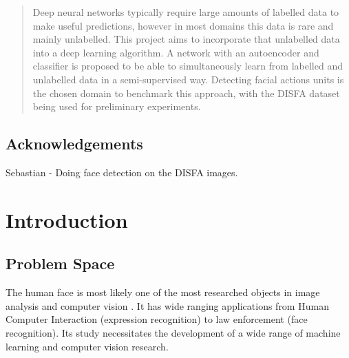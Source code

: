 \documentclass[11pt,twoside]{report}
\date{September 2016}
\begin{document}



\clearpage{\pagestyle{empty}\cleardoublepage}
\setcounter{page}{1}
\pagestyle{fancy}

\begin{abstract}
  Deep neural networks typically require large amounts of labelled data to make useful
  predictions, however in most domains this data is rare and mainly unlabelled.
  This project aims to incorporate that unlabelled data into a deep learning algorithm.
  A network with an autoencoder and classifier is proposed to be able to simultaneously
  learn from labelled and unlabelled data in a semi-supervised way. Detecting
  facial actions units is the chosen domain to benchmark this approach, with
  the DISFA dataset being used for preliminary experiments.
\end{abstract}

\cleardoublepage
\section*{Acknowledgements}
Sebastian - Doing face detection on the DISFA images.

\clearpage{\pagestyle{empty}\cleardoublepage}

\tableofcontents


\clearpage{\pagestyle{empty}\cleardoublepage}
\setcounter{page}{1}
\fancyhead[LE,RO]{\slshape \rightmark}
\fancyhead[LO,RE]{\slshape \leftmark}

\chapter{Introduction}
\section{Problem Space}
The human face is most likely one of the most researched objects in image analysis
and computer vision \cite{S.ZafeiriouA.PapaioannouI.KotsiaM.A.Nicolaou}.
It has wide ranging applications from Human
Computer Interaction (expression recognition) to law enforcement (face recognition).
Its study necessitates the development of a wide range of machine
learning and computer vision research.
\end{document}
